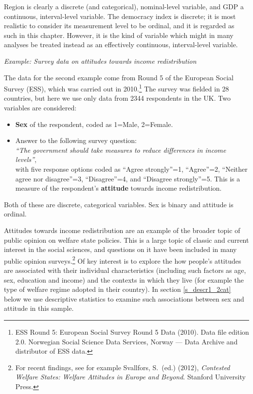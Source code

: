 Region is clearly a discrete (and categorical), nominal-level variable,
and GDP a continuous, interval-level variable. The democracy index is
discrete; it is most realistic to consider its measurement level to be
ordinal, and it is regarded as such in this chapter. However, it is the
kind of variable which might in many analyses be treated instead
as an effectively continuous, interval-level variable.

\emph{Example: Survey data on attitudes towards income redistribution}
\label{p_ess_example}

The data for the second example come from Round 5 of the European Social
Survey (ESS), which was carried out in 2010.\footnote{ESS Round 5:
European Social Survey Round 5 Data (2010). Data file edition 2.0.
Norwegian Social Science Data Services, Norway --- Data Archive and
distributor of ESS data.} The survey was fielded in 28 countries, but
here we use only data from 2344 respondents in the UK. Two variables are
considered:
\begin{itemize}
\item
\textbf{Sex} of the respondent, coded as 1=Male, 2=Female.
\item
Answer to the following survey question:\\
\emph{``The government should
take measures to reduce differences in income levels''},\\
with five response
options coded as ``Agree strongly''=1, ``Agree''=2, ``Neither agree nor
disagree''=3, ``Disagree''=4, and ``Disagree strongly''=5. This is a
measure of the respondent's \textbf{attitude} towards  income
redistribution.
\end{itemize}
Both of these are discrete, categorical variables. Sex is
binary and attitude is ordinal.

Attitudes towards income redistribution are an example of the broader
topic of public opinion on welfare state policies. This is a large topic
of classic and current interest in the social sciences, and questions on
it have been included in many public opinion surveys.\footnote{For
recent findings, see for example Svallfors, S.\ (ed.) (2012),
\emph{Contested Welfare States: Welfare Attitudes in Europe and Beyond}.
Stanford University Press.} Of key interest is to explore the
how people's attitudes are associated with their individual
characteristics (including such factors as age, sex, education and
income) and the contexts in which they live (for example the type
of welfare regime adopted in their country). In section
\ref{s_descr1_2cat} below we use descriptive statistics to examine
such associations between sex and attitude in this sample.


